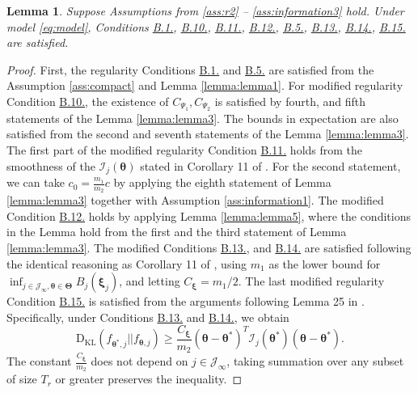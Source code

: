 \documentclass[12pt]{article}
\newcommand{\bfTheta}{\boldsymbol{\Theta}}
\newcommand{\bftheta}{\boldsymbol{\theta}}
\newcommand{\bfxi}{\boldsymbol{\xi}}
\newtheorem{lemma}[theorem]{Lemma}
\begin{document}
\begin{lemma} \label{lemma:lemma6}
Suppose Assumptions from \ref{ass:r2} -- \ref{ass:information3} hold. Under model \eqref{eq:model}, Conditions \hyperref[c:c1]{B.1.}, \hyperref[c:c2']{B.10.}, \hyperref[c:c3']{B.11.}, \hyperref[c:c4']{B.12.}, \hyperref[c:c5]{B.5.}, \hyperref[c:c6a']{B.13.}, \hyperref[c:c7a']{B.14.}, \hyperref[c:c7b']{B.15.} are satisfied.
\end{lemma}
\begin{proof}
First, the regularity Conditions \hyperref[c:c1]{B.1.} and \hyperref[c:c5]{B.5.} are satisfied from the Assumption \ref{ass:compact} and Lemma \ref{lemma:lemma1}. For modified regularity Condition \hyperref[c:c2']{B.10.}, the existence of $C_{\Psi_1}, C_{\Psi_2}$ is satisfied by fourth, and fifth statements of the Lemma \ref{lemma:lemma3}. The bounds in expectation are also satisfied from the second and seventh statements of the Lemma \ref{lemma:lemma3}. The first part of the modified regularity Condition \hyperref[c:c3']{B.11.} holds from the smoothness of the $\mathcal{I}_j(\bftheta)$ stated in Corollary 11 of . For the second statement, we can take $c_0 = \frac{m_1}{m_2} c$ by applying the eighth statement of Lemma \ref{lemma:lemma3} together with Assumption \ref{ass:information1}.
The modified Condition \hyperref[c:c4']{B.12.} holds by applying Lemma \ref{lemma:lemma5}, where the conditions in the Lemma hold from the first and the third statement of Lemma \ref{lemma:lemma3}.
The modified Conditions \hyperref[c:c6a']{B.13.}, and \hyperref[c:c7a']{B.14.} are satisfied following the identical reasoning as Corollary 11 of , using $m_1$ as the lower bound for $\inf_{j \in \mathcal{J}_{\infty}, \bftheta \in \bfTheta} B_j( \bfxi_j )$, and letting $C_{\bfxi} = m_1/2$. The last modified regularity Condition \hyperref[c:c7b']{B.15.} is satisfied from the arguments following Lemma 25 in . Specifically, under Conditions \hyperref[c:c6a']{B.13.} and \hyperref[c:c7a']{B.14.}, we obtain
\begin{equation*}
\mathrm{D}_{\mathrm{KL}}( f_{\bftheta^{\ast}, j} || f_{\bftheta, j}) \ge \frac{C_{\bfxi}}{m_2} (\bftheta - \bftheta^{\ast})^{T} \mathcal{I}_j(\bftheta^{\ast}) (\bftheta - \bftheta^{\ast}).
\end{equation*}
The constant $\frac{C_{\bfxi}}{m_2}$ does not depend on $j \in \mathcal{J}_{\infty}$, taking summation over any subset of size $T_r$ or greater preserves the inequality. 
\end{proof}
\end{document}
